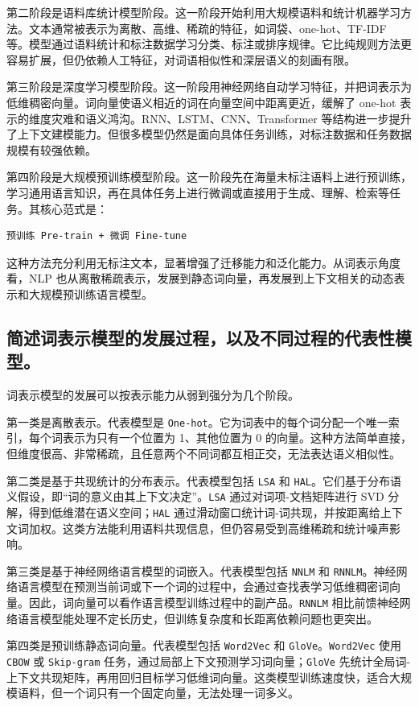 第二阶段是语料库统计模型阶段。这一阶段开始利用大规模语料和统计机器学习方法。文本通常被表示为离散、高维、稀疏的特征，如词袋、one-hot、TF-IDF 等。模型通过语料统计和标注数据学习分类、标注或排序规律。它比纯规则方法更容易扩展，但仍依赖人工特征，对词语相似性和深层语义的刻画有限。

第三阶段是深度学习模型阶段。这一阶段用神经网络自动学习特征，并把词表示为低维稠密向量。词向量使语义相近的词在向量空间中距离更近，缓解了 one-hot 表示的维度灾难和语义鸿沟。RNN、LSTM、CNN、Transformer 等结构进一步提升了上下文建模能力。但很多模型仍然是面向具体任务训练，对标注数据和任务数据规模有较强依赖。

第四阶段是大规模预训练模型阶段。这一阶段先在海量未标注语料上进行预训练，学习通用语言知识，再在具体任务上进行微调或直接用于生成、理解、检索等任务。其核心范式是：
\begin{Verbatim}[breaklines=true]
预训练 Pre-train + 微调 Fine-tune
\end{Verbatim}

这种方法充分利用无标注文本，显著增强了迁移能力和泛化能力。从词表示角度看，NLP 也从离散稀疏表示，发展到静态词向量，再发展到上下文相关的动态表示和大规模预训练语言模型。

\subsection{简述词表示模型的发展过程，以及不同过程的代表性模型。}

词表示模型的发展可以按表示能力从弱到强分为几个阶段。

第一类是离散表示。代表模型是 \texttt{One-hot}。它为词表中的每个词分配一个唯一索引，每个词表示为只有一个位置为 1、其他位置为 0 的向量。这种方法简单直接，但维度很高、非常稀疏，且任意两个不同词都互相正交，无法表达语义相似性。

第二类是基于共现统计的分布表示。代表模型包括 \texttt{LSA} 和 \texttt{HAL}。它们基于分布语义假设，即“词的意义由其上下文决定”。\texttt{LSA} 通过对词项-文档矩阵进行 SVD 分解，得到低维潜在语义空间；\texttt{HAL} 通过滑动窗口统计词-词共现，并按距离给上下文词加权。这类方法能利用语料共现信息，但仍容易受到高维稀疏和统计噪声影响。

第三类是基于神经网络语言模型的词嵌入。代表模型包括 \texttt{NNLM} 和 \texttt{RNNLM}。神经网络语言模型在预测当前词或下一个词的过程中，会通过查找表学习低维稠密词向量。因此，词向量可以看作语言模型训练过程中的副产品。\texttt{RNNLM} 相比前馈神经网络语言模型能处理不定长历史，但训练复杂度和长距离依赖问题也更突出。

第四类是预训练静态词向量。代表模型包括 \texttt{Word2Vec} 和 \texttt{GloVe}。\texttt{Word2Vec} 使用 \texttt{CBOW} 或 \texttt{Skip-gram} 任务，通过局部上下文预测学习词向量；\texttt{GloVe} 先统计全局词-上下文共现矩阵，再用回归目标学习低维词向量。这类模型训练速度快，适合大规模语料，但一个词只有一个固定向量，无法处理一词多义。

